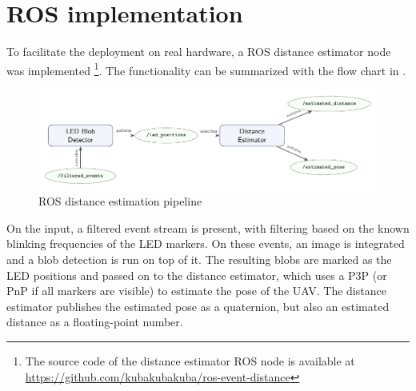 \section{ROS implementation}
To facilitate the deployment on real hardware, a ROS distance estimator node was implemented
\footnote{The source code of the distance estimator ROS node is available at \url{https://github.com/kubakubakuba/ros-event-distance}}.
The functionality can be summarized with the flow chart 
in
.
\begin{figure}[H]
	\centering
	\includegraphics[width=1.0\textwidth]{./fig/tikz/rosflow.pdf}
	\caption{ROS distance estimation pipeline}
	\label{fig:rosflow}
\end{figure}
On the input, a filtered event stream is present, with filtering based on the known blinking frequencies of the \ac{LED} markers.
On these events, an image is integrated and a blob detection is run on top of it. The resulting blobs are marked as the \ac{LED} positions and passed 
on to the distance estimator, which uses a \ac{P3P} (or \ac{PnP} if all markers are visible) to estimate the pose of the \ac{UAV}. The distance estimator publishes the estimated pose as a quaternion, but also an estimated distance as a floating-point number.